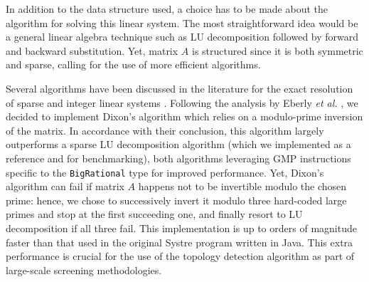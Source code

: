 \documentclass[main.tex]{subfiles}
\begin{document}
In addition to the data structure used, a choice has to be made about the algorithm for solving this linear system. The most straightforward idea would be a general linear algebra technique such as LU decomposition followed by forward and backward substitution. Yet, matrix $A$ is structured since it is both symmetric and sparse, calling for the use of more efficient algorithms. %


Several algorithms have been discussed in the literature for the exact resolution of sparse and integer linear systems \autocite{sparseLinearRational,blackbox,Dixon,Wiedemann}. Following the analysis by Eberly \textit{et al.} \autocite{sparseLinearRational}, we decided to implement Dixon's algorithm \autocite{Dixon} which relies on a modulo-prime inversion of the matrix. In accordance with their conclusion, this algorithm largely outperforms a sparse LU decomposition algorithm (which we implemented as a reference and for benchmarking), both algorithms leveraging GMP instructions specific to the \texttt{BigRational} type for improved performance. Yet, Dixon's algorithm can fail if matrix $A$ happens not to be invertible modulo the chosen prime: hence, we chose to successively invert it modulo three hard-coded large primes and stop at the first succeeding one, and finally resort to LU decomposition if all three fail.
This implementation is up to orders of magnitude faster than that used in the original Systre program written in Java. This extra performance is crucial for the use of the topology detection algorithm as part of large-scale screening methodologies.

\end{document}
